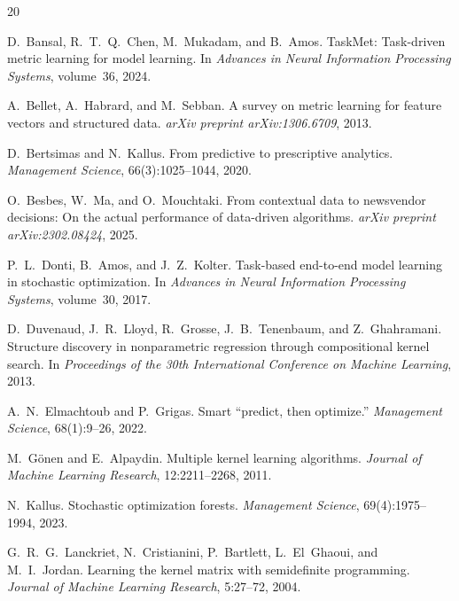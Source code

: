 \documentclass[11pt]{article}
\begin{document}
\begin{thebibliography}{20}

D.~Bansal, R.~T.~Q.~Chen, M.~Mukadam, and B.~Amos.
\newblock TaskMet: Task-driven metric learning for model learning.
\newblock In \emph{Advances in Neural Information Processing Systems}, volume~36, 2024.

A.~Bellet, A.~Habrard, and M.~Sebban.
\newblock A survey on metric learning for feature vectors and structured data.
\newblock \emph{arXiv preprint arXiv:1306.6709}, 2013.

D.~Bertsimas and N.~Kallus.
\newblock From predictive to prescriptive analytics.
\newblock \emph{Management Science}, 66(3):1025--1044, 2020.

O.~Besbes, W.~Ma, and O.~Mouchtaki.
\newblock From contextual data to newsvendor decisions: On the actual
  performance of data-driven algorithms.
\newblock \emph{arXiv preprint arXiv:2302.08424}, 2025.

P.~L.~Donti, B.~Amos, and J.~Z.~Kolter.
\newblock Task-based end-to-end model learning in stochastic optimization.
\newblock In \emph{Advances in Neural Information Processing Systems}, volume~30, 2017.

D.~Duvenaud, J.~R.~Lloyd, R.~Grosse, J.~B.~Tenenbaum, and Z.~Ghahramani.
\newblock Structure discovery in nonparametric regression through compositional kernel search.
\newblock In \emph{Proceedings of the 30th International Conference on Machine Learning}, 2013.

A.~N.~Elmachtoub and P.~Grigas.
\newblock Smart ``predict, then optimize.''
\newblock \emph{Management Science}, 68(1):9--26, 2022.

M.~G\"onen and E.~Alpaydin.
\newblock Multiple kernel learning algorithms.
\newblock \emph{Journal of Machine Learning Research}, 12:2211--2268, 2011.

N.~Kallus.
\newblock Stochastic optimization forests.
\newblock \emph{Management Science}, 69(4):1975--1994, 2023.

G.~R.~G.~Lanckriet, N.~Cristianini, P.~Bartlett, L.~El~Ghaoui, and M.~I.~Jordan.
\newblock Learning the kernel matrix with semidefinite programming.
\newblock \emph{Journal of Machine Learning Research}, 5:27--72, 2004.


\end{thebibliography}
\end{document}

